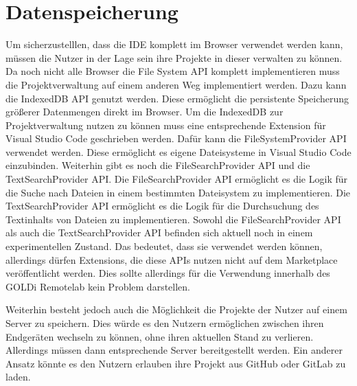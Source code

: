 \section{Datenspeicherung} \label{datenspeicherung}

Um sicherzustelllen, dass die IDE komplett im Browser verwendet werden kann, müssen die Nutzer in der Lage sein ihre Projekte in dieser verwalten zu können. Da noch nicht alle Browser die File System API komplett implementieren muss die Projektverwaltung auf einem anderen Weg implementiert werden. Dazu kann die IndexedDB API genutzt werden. Diese ermöglicht die persistente Speicherung größerer Datenmengen direkt im Browser. Um die IndexedDB zur Projektverwaltung nutzen zu können muss eine entsprechende Extension für Visual Studio Code geschrieben werden. Dafür kann die FileSystemProvider API verwendet werden. Diese ermöglicht es eigene Dateisysteme in Visual Studio Code einzubinden. Weiterhin gibt es noch die FileSearchProvider API und die TextSearchProvider API. Die FileSearchProvider API ermöglicht es die Logik für die Suche nach Dateien in einem bestimmten Dateisystem zu implementieren. Die TextSearchProvider API ermöglicht es die Logik für die Durchsuchung des Textinhalts von Dateien zu implementieren. Sowohl die FileSearchProvider API als auch die TextSearchProvider API befinden sich aktuell noch in einem experimentellen Zustand. Das bedeutet, dass sie verwendet werden können, allerdings dürfen Extensions, die diese APIs nutzen nicht auf dem Marketplace veröffentlicht werden. Dies sollte allerdings für die Verwendung innerhalb des GOLDi Remotelab kein Problem darstellen.

Weiterhin besteht jedoch auch die Möglichkeit die Projekte der Nutzer auf einem Server zu speichern. Dies würde es den Nutzern ermöglichen zwischen ihren Endgeräten wechseln zu können, ohne ihren aktuellen Stand zu verlieren. Allerdings müssen dann entsprechende Server bereitgestellt werden. Ein anderer Ansatz könnte es den Nutzern erlauben ihre Projekt aus GitHub oder GitLab zu laden.